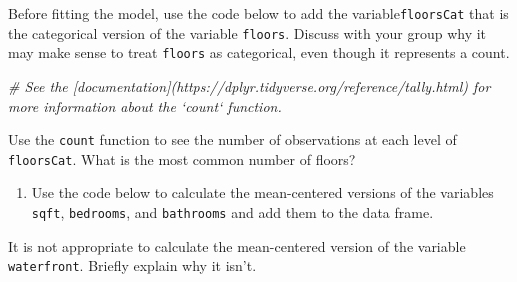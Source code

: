 \documentclass[]{book}
\newenvironment{Shaded}{\begin{snugshade}}{\end{snugshade}}
\newcommand{\KeywordTok}[1]{\textcolor[rgb]{0.13,0.29,0.53}{\textbf{#1}}}
\newcommand{\DataTypeTok}[1]{\textcolor[rgb]{0.13,0.29,0.53}{#1}}
\newcommand{\StringTok}[1]{\textcolor[rgb]{0.31,0.60,0.02}{#1}}
\newcommand{\CommentTok}[1]{\textcolor[rgb]{0.56,0.35,0.01}{\textit{#1}}}
\newcommand{\OperatorTok}[1]{\textcolor[rgb]{0.81,0.36,0.00}{\textbf{#1}}}
\newcommand{\NormalTok}[1]{#1}
\providecommand{\tightlist}{%
  \setlength{\itemsep}{0pt}\setlength{\parskip}{0pt}}
\begin{document}
Before fitting the model, use the code below to add the
variable\texttt{floorsCat} that is the categorical version of the
variable \texttt{floors}. Discuss with your group why it may make sense
to treat \texttt{floors} as categorical, even though it represents a
count.

\begin{Shaded}
\end{Shaded}

\begin{Shaded}
\begin{Highlighting}[]
\CommentTok{# See the [documentation](https://dplyr.tidyverse.org/reference/tally.html) for more information about the `count` function.}
\end{Highlighting}
\end{Shaded}

Use the \texttt{count} function to see the number of observations at
each level of \texttt{floorsCat}. What is the most common number of
floors?

\begin{enumerate}
\def\labelenumi{\arabic{enumi}.}
\setcounter{enumi}{7}
\tightlist
\item
  Use the code below to calculate the mean-centered versions of the
  variables \texttt{sqft}, \texttt{bedrooms}, and \texttt{bathrooms} and
  add them to the data frame.
\end{enumerate}

\begin{Shaded}
\end{Shaded}

It is not appropriate to calculate the mean-centered version of the
variable \texttt{waterfront}. Briefly explain why it isn't.
\end{document}
